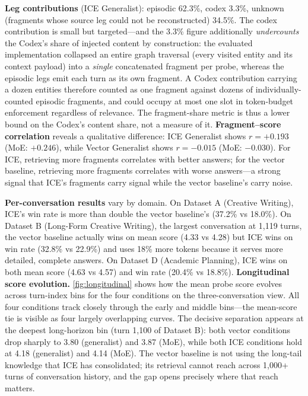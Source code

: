 \documentclass[11pt,a4paper]{article}
\begin{document}
\textbf{Leg contributions} (ICE Generalist): episodic 62.3\%, codex 3.3\%, unknown (fragments whose source leg could not be reconstructed) 34.5\%. The codex contribution is small but targeted---and the 3.3\% figure additionally \emph{undercounts} the Codex's share of injected content by construction: the evaluated implementation collapsed an entire graph traversal (every visited entity and its context payload) into a \emph{single} concatenated fragment per probe, whereas the episodic legs emit each turn as its own fragment. A Codex contribution carrying a dozen entities therefore counted as one fragment against dozens of individually-counted episodic fragments, and could occupy at most one slot in token-budget enforcement regardless of relevance. The fragment-share metric is thus a lower bound on the Codex's content share, not a measure of it. \textbf{Fragment--score correlation} reveals a qualitative difference: ICE Generalist shows $r = +0.193$ (MoE: $+0.246$), while Vector Generalist shows $r = -0.015$ (MoE: $-0.030$). For ICE, retrieving more fragments correlates with better answers; for the vector baseline, retrieving more fragments correlates with worse answers---a strong signal that ICE's fragments carry signal while the vector baseline's carry noise.

\textbf{Per-conversation results} vary by domain. On Dataset A (Creative Writing), ICE's win rate is more than double the vector baseline's (37.2\% vs 18.0\%). On Dataset B (Long-Form Creative Writing), the largest conversation at 1{,}119 turns, the vector baseline actually wins on mean score (4.33 vs 4.28) but ICE wins on win rate (32.8\% vs 22.9\%) and uses 18\% more tokens because it serves more detailed, complete answers. On Dataset D (Academic Planning), ICE wins on both mean score (4.63 vs 4.57) and win rate (20.4\% vs 18.8\%). \textbf{Longitudinal score evolution.} \cref{fig:longitudinal} shows how the mean probe score evolves across turn-index bins for the four conditions on the three-conversation view. All four conditions track closely through the early and middle bins---the mean-score tie is visible as four largely overlapping curves. The decisive separation appears at the deepest long-horizon bin (turn 1{,}100 of Dataset B): both vector conditions drop sharply to 3.80 (generalist) and 3.87 (MoE), while both ICE conditions hold at 4.18 (generalist) and 4.14 (MoE). The vector baseline is not using the long-tail knowledge that ICE has consolidated; its retrieval cannot reach across 1{,}000+ turns of conversation history, and the gap opens precisely where that reach matters.
\end{document}
